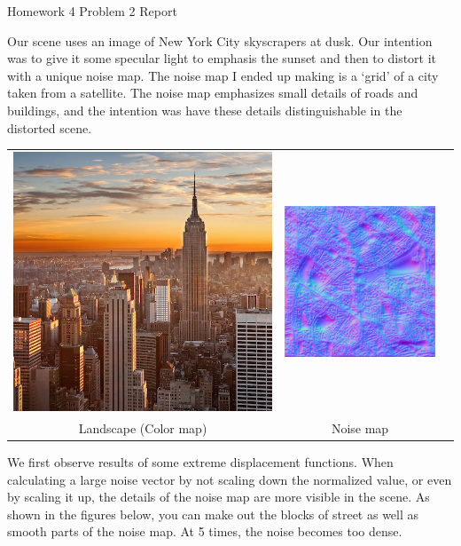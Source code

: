 \documentclass[twoside,11pt]{article}
\theoremstyle{definition}
\begin{document}
\centerline{\Large Homework 4 Problem 2 Report}
\vspace{.2in}

Our scene uses an image of New York City skyscrapers at dusk. Our intention was to give it some specular light to emphasis the sunset and then to distort it with a unique noise map. The noise map I ended up making is a `grid' of a city taken from a satellite. The noise map emphasizes small details of roads and buildings, and the intention was have these details distinguishable in the distorted scene. 

\begin{center}\begin{tabular}{ccc}
	\includegraphics[width=.3\textwidth]{color-map_landscape} &
	\includegraphics[width=.3\textwidth]{noise-map_city}\\
	Landscape (Color map) & Noise map
\end{tabular}\end{center}
We first observe results of some extreme displacement functions. When calculating a large noise vector by not scaling down the normalized value, or even by scaling it up, the details of the noise map are more visible in the scene. As shown in the figures below, you can make out the blocks of street as well as smooth parts of the noise map. At 5 times, the noise becomes too dense. 
\end{document}
